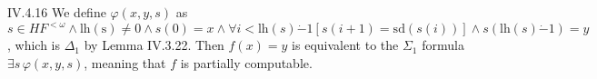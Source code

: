 \documentclass[12pt]{article}
\begin{document}
\begin{customthm}{IV.4.16}
  We define $\varphi(x,y,s)$ as $s\in HF^{<\omega}\wedge \mathrm{lh(s)}\neq0\wedge s(0)=x\wedge\forall i<\mathrm{lh}(s)\dot{-}1[s(i+1)=\mathrm{sd}(s(i))]\wedge s(\mathrm{lh}(s)\dot{-}1)=y$, which is $\Delta_1$ by Lemma IV.3.22. Then $f(x)=y$ is equivalent to the $\Sigma_1$ formula $\exists s\,\varphi(x,y,s)$, meaning that $f$ is partially computable.
\end{customthm}
\end{document}
